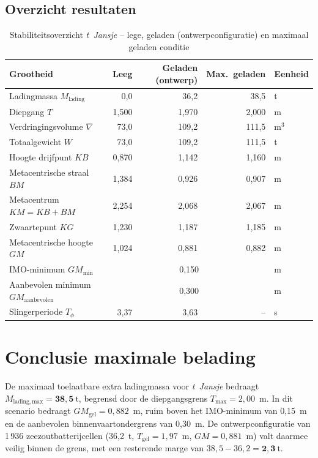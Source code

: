 \subsection{Overzicht resultaten}
 
\begin{table}[H]
    \centering
    \caption{Stabiliteitsoverzicht \emph{t~Jansje} – lege, geladen (ontwerpconfiguratie) en maximaal geladen conditie}
    \label{tab:stabiliteit-overzicht-max}
    \begin{tabular}{lrrrl}
        \toprule
        Grootheid & Leeg & Geladen (ontwerp) & Max.\ geladen & Eenheid \\
        \midrule
        Ladingmassa $M_\mathrm{lading}$          &  0{,}0  & 36{,}2  & 38{,}5  & t   \\
        Diepgang $T$                              &  1{,}500& 1{,}970 & 2{,}000 & m   \\
        Verdringingsvolume $\nabla$               & 73{,}0  &109{,}2  &111{,}5  & m$^3$ \\
        Totaalgewicht $W$                         & 73{,}0  &109{,}2  &111{,}5  & t   \\
        Hoogte drijfpunt $KB$                     &  0{,}870&  1{,}142&  1{,}160& m   \\
        Metacentrische straal $BM$                &  1{,}384&  0{,}926&  0{,}907& m   \\
        Metacentrum $KM = KB + BM$               &  2{,}254&  2{,}068&  2{,}067& m   \\
        Zwaartepunt $KG$                          &  1{,}230&  1{,}187&  1{,}185& m   \\
        Metacentrische hoogte $GM$                &  1{,}024&  0{,}881&  0{,}882& m   \\
        IMO-minimum $GM_\mathrm{min}$             & \multicolumn{3}{c}{0{,}150} & m \\
        Aanbevolen minimum $GM_\mathrm{aanbevolen}$& \multicolumn{3}{c}{0{,}300} & m \\
        Slingerperiode $T_\phi$                   &  3{,}37 &  3{,}63 &  –      & s   \\
        \bottomrule
    \end{tabular}
\end{table}
 
\section{Conclusie maximale belading}
\label{sec:max-belading-conclusie}
 
De maximaal toelaatbare extra ladingmassa voor \emph{t~Jansje} bedraagt
$M_{\mathrm{lading,max}} = \mathbf{38{,}5\ \mathrm{t}}$, begrensd door de
diepgangsgrens $T_\mathrm{max} = 2{,}00$~m. In dit scenario bedraagt
$GM_\mathrm{gel} = 0{,}882$~m, ruim boven het IMO-minimum van 0{,}15~m en de
aanbevolen binnenvaartondergrens van 0{,}30~m. De ontwerpconfiguratie van 1\,936
zeezoutbatterijcellen (36{,}2~t, $T_\mathrm{gel} = 1{,}97$~m, $GM = 0{,}881$~m) valt
daarmee veilig binnen de grens, met een resterende marge van
$38{,}5 - 36{,}2 = \mathbf{2{,}3\ \mathrm{t}}$.